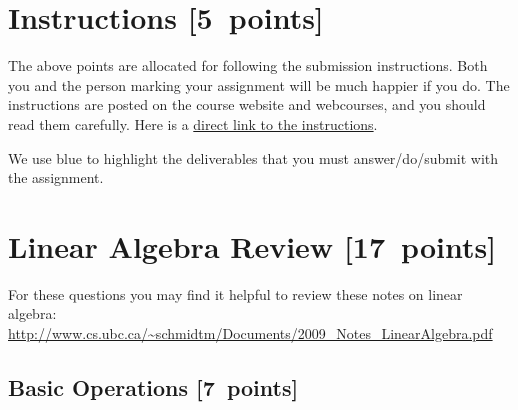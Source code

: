 \documentclass{article}
\newcommand{\blu}[1]{{\textcolor{blu}{#1}}}
\let\ask\blu
\newcommand\pts[1]{\textcolor{pointscolour}{[#1~points]}}
\begin{document}
  \section*{Instructions \pts{5}}

  The above points are allocated for following the submission
  instructions. Both you and the person marking your assignment will be
  much happier if you do. The instructions are posted on the course
  website and webcourses, and you should read them carefully. Here is a \href{https://www.dropbox.com/scl/fi/gpwv8s5b6xx16cepm1bn9/submission_instructions.pdf?rlkey=m3l066bopj9bu1l9m53rbcucs&raw=1}{direct link to the instructions}.

  \vspace{1em}
  We use \ask{blue} to highlight the deliverables that you must answer/do/submit with the assignment.

  \section{Linear Algebra Review \pts{17}}

  For these questions you may find it helpful to review these notes on linear algebra:\\
  \url{http://www.cs.ubc.ca/~schmidtm/Documents/2009_Notes_LinearAlgebra.pdf}

  \subsection{Basic Operations \pts{7}}
\end{document}
